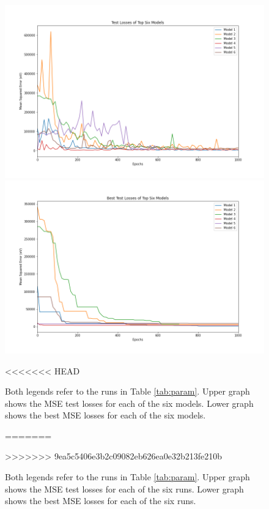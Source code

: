 \documentclass[12pt, abstract = true]{scrartcl}
\begin{document}
\begin{figure}
  \centering
  \includegraphics[scale=.5]{test.png}
  \includegraphics[scale=.5]{best.png}
  
<<<<<<< HEAD
  \caption{Both legends refer to the runs in Table \ref{tab:param}. Upper graph shows the MSE test losses for each of the six models. Lower graph shows the best MSE losses for each of the six models. }\label{fig:graph}
=======
  \caption{Both legends refer to the runs in Table \ref{tab:param}. Upper graph shows the MSE test losses for each of the six runs. Lower graph shows the best MSE losses for each of the six runs. }\label{fig:graph}
>>>>>>> 9ea5c5406e3b2c09082eb626ea0e32b213fe210b
\end{figure}
\end{document}
